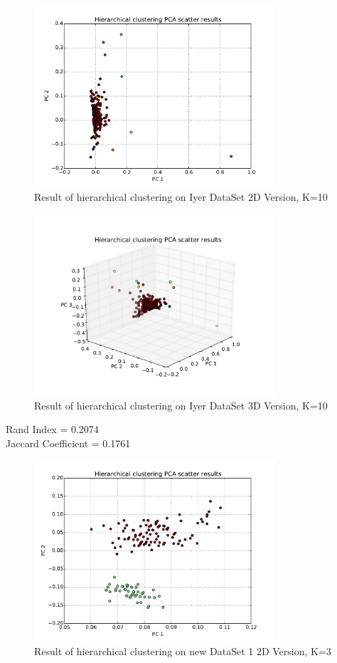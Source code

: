 \documentclass[paper=letter, fontsize=11pt]{article}
\numberwithin{equation}{section}		%
\numberwithin{figure}{section}			%
\numberwithin{table}{section}				%
\begin{document}
\begin{figure}[H]
	\centering
	\includegraphics[width=0.8\textwidth]{H_iyer_2D.pdf}
	\caption{Result of hierarchical clustering on Iyer DataSet 2D Version, K=10}
\end{figure}

\begin{figure}[H]
	\centering
	\includegraphics[width=0.8\textwidth]{H_iyer_3D.pdf}
	\caption{Result of hierarchical clustering on Iyer DataSet 3D Version, K=10}
\end{figure}
\noindent Rand Index = 0.2074\\
Jaccard Coefficient = 0.1761\\

\begin{figure}[H]
	\centering
	\includegraphics[width=0.8\textwidth]{H_new_dataset_1_2D.pdf}
	\caption{Result of hierarchical clustering on new DataSet  1 2D Version, K=3}
\end{figure}
\end{document}
